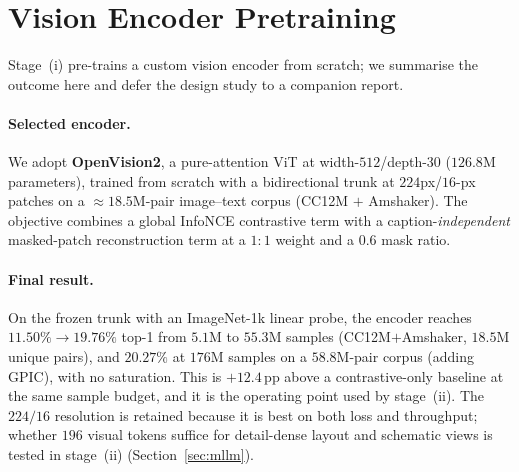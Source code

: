 ﻿\section{Vision Encoder Pretraining}\label{sec:vision}

Stage~(i) pre-trains a custom vision encoder from scratch; we summarise the outcome here and defer the design study to a companion report.

\paragraph{Selected encoder.}
We adopt \textbf{OpenVision2}, a pure-attention ViT at width-$512$/depth-$30$ ($126.8$M parameters), trained from scratch with a bidirectional trunk at $224$px/$16$-px patches on a ${\approx}18.5$M-pair image--text corpus (CC12M $+$ Amshaker).
The objective combines a global InfoNCE contrastive term with a caption-\emph{independent} masked-patch reconstruction term at a $1{:}1$ weight and a $0.6$ mask ratio.

\paragraph{Final result.}
On the frozen trunk with an ImageNet-1k linear probe, the encoder reaches $11.50\%\to\mathbf{19.76\%}$ top-1 from $5.1$M to $55.3$M samples (CC12M$+$Amshaker, $18.5$M unique pairs), and $20.27\%$ at $176$M samples on a $58.8$M-pair corpus (adding GPIC), with no saturation.
This is $+12.4$\,pp above a contrastive-only baseline at the same sample budget, and it is the operating point used by stage~(ii).
The $224/16$ resolution is retained because it is best on both loss and throughput; whether $196$ visual tokens suffice for detail-dense layout and schematic views is tested in stage~(ii) (Section~\ref{sec:mllm}).

